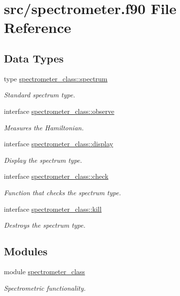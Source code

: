 \hypertarget{spectrometer_8f90}{}\section{src/spectrometer.f90 File Reference}
\label{spectrometer_8f90}
\subsection*{Data Types}
\begin{DoxyCompactItemize}
\item 
type \hyperlink{structspectrometer__class_1_1spectrum}{spectrometer\+\_\+class\+::spectrum}
\begin{DoxyCompactList}\small\item\em Standard spectrum type. \end{DoxyCompactList}\item 
interface \hyperlink{interfacespectrometer__class_1_1observe}{spectrometer\+\_\+class\+::observe}
\begin{DoxyCompactList}\small\item\em Measures the Hamiltonian. \end{DoxyCompactList}\item 
interface \hyperlink{interfacespectrometer__class_1_1display}{spectrometer\+\_\+class\+::display}
\begin{DoxyCompactList}\small\item\em Display the spectrum type. \end{DoxyCompactList}\item 
interface \hyperlink{interfacespectrometer__class_1_1check}{spectrometer\+\_\+class\+::check}
\begin{DoxyCompactList}\small\item\em Function that checks the spectrum type. \end{DoxyCompactList}\item 
interface \hyperlink{interfacespectrometer__class_1_1kill}{spectrometer\+\_\+class\+::kill}
\begin{DoxyCompactList}\small\item\em Destroys the spectrum type. \end{DoxyCompactList}\end{DoxyCompactItemize}
\subsection*{Modules}
\begin{DoxyCompactItemize}
\item 
module \hyperlink{namespacespectrometer__class}{spectrometer\+\_\+class}
\begin{DoxyCompactList}\small\item\em Spectrometric functionality. \end{DoxyCompactList}\end{DoxyCompactItemize}
